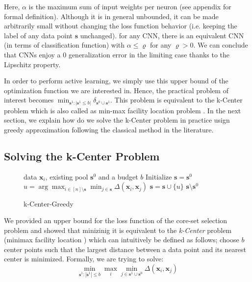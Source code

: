\documentclass{article} %
\makeatletter
\newcommand*{\ie}{i.e.\@\xspace}
\makeatother
\begin{document}
Here, $\alpha$ is the maximum sum of  input weights per neuron (see appendix for formal definition). Although it is in
general unbounded, it can be made arbitrarily small without changing the loss function behavior (\ie keeping the label
of any data point $\mathbf{s}$ unchanged). %
for any CNN, there is an equivalent CNN (in terms of classification function) with $\alpha \leq \varrho$ for any
$\varrho > 0$. We can conclude that CNNs enjoy a $0$ generalization error in the limiting case thanks to the Lipschitz
property.

In order to perform active learning, we simply use this upper bound of the optimization function we are interested in.
Hence, the practical problem of interest becomes $\min_{\mathbf{s}^1:|\mathbf{s}^1 \leq b|} \delta_{\mathbf{s}^0\cup
\mathbf{s}^1}$. This problem is equivalent to the k-Center problem which is also called as min-max facility location
problem \citep{k-center}. In the next section, we explain how do we solve the k-Center problem in practice usign greedy
approximation following the classical method in the literature.

\newpage

\subsection{Solving the k-Center Problem} 
\label{sec:alg} 
\begin{figure}
\begin{minipage}{0.44\textwidth}
\vspace{-8mm}
   \begin{algorithm}[H] 
   \caption{k-Center-Greedy} 
   \label{alg:greedy} 
   \begin{algorithmic} 
    data $\mathbf{x}_i$, existing pool $\mathbf{s}^0$ and a budget $b$ 
   \STATE Initialize $\mathbf{s}=\mathbf{s}^0$ \REPEAT \STATE $u=\arg\max_{i \in [n] \setminus \mathbf{s}} \min_{j \in \mathbf{s}} \Delta(\mathbf{x}_i, \mathbf{x}_j)$ \STATE $\mathbf{s} = \mathbf{s} \cup \{u\}$ 
    $\mathbf{s} \setminus \mathbf{s}^0$ \end{algorithmic}
\end{algorithm} 
\vspace{-10mm}
\end{minipage} 
\end{figure}
We provided an upper bound for the loss function of the core-set selection problem and showed that minizinig it is equivalent to the \emph{k-Center} problem (minimax facility location \citep{facility}) which can intuitively be defined as follows; choose $b$ center points such that the  largest distance between a data point and its nearest center is minimized. Formally, we are trying to solve: 
\begin{equation}
    \min_{\mathbf{s}^1:|\mathbf{s}^1| \leq b} \max_i \min_{j \in \mathbf{s}^1 \cup \mathbf{s}^0} \Delta(\mathbf{x}_i,\mathbf{x}_j)
\end{equation}
\end{document}
